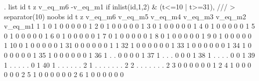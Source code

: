 . list id t z v_eq_m6 -v_eq_m1 if inlist(id,1,2) \& (t<=10 | t>=31), ///
> separator(10) noobs
{\smallskip}
  {\TLC}
  {\VBAR} id    t   z   v_eq_m6   v_eq_m5   v_eq_m4   v_eq_m3   v_eq_m2   v_eq_m1 {\VBAR}
  {\LFTT}
  {\VBAR}  1    1   0         1         0         0         0         0         0 {\VBAR}
  {\VBAR}  1    2   0         1         0         0         0         0         0 {\VBAR}
  {\VBAR}  1    3   0         1         0         0         0         0         0 {\VBAR}
  {\VBAR}  1    4   0         1         0         0         0         0         0 {\VBAR}
  {\VBAR}  1    5   0         1         0         0         0         0         0 {\VBAR}
  {\VBAR}  1    6   0         1         0         0         0         0         0 {\VBAR}
  {\VBAR}  1    7   0         1         0         0         0         0         0 {\VBAR}
  {\VBAR}  1    8   0         1         0         0         0         0         0 {\VBAR}
  {\VBAR}  1    9   0         1         0         0         0         0         0 {\VBAR}
  {\VBAR}  1   10   0         1         0         0         0         0         0 {\VBAR}
  {\LFTT}
  {\VBAR}  1   31   0         0         0         0         0         0         1 {\VBAR}
  {\VBAR}  1   32   1         0         0         0         0         0         0 {\VBAR}
  {\VBAR}  1   33   1         0         0         0         0         0         0 {\VBAR}
  {\VBAR}  1   34   1         0         0         0         0         0         0 {\VBAR}
  {\VBAR}  1   35   1         0         0         0         0         0         0 {\VBAR}
  {\VBAR}  1   36   1         .         .         0         0         0         0 {\VBAR}
  {\VBAR}  1   37   1         .         .         .         0         0         0 {\VBAR}
  {\VBAR}  1   38   1         .         .         .         .         0         0 {\VBAR}
  {\VBAR}  1   39   1         .         .         .         .         .         0 {\VBAR}
  {\VBAR}  1   40   1         .         .         .         .         .         . {\VBAR}
  {\LFTT}
  {\VBAR}  2    1   .         .         .         .         .         .         . {\VBAR}
  {\VBAR}  2    2   .         .         .         .         .         .         . {\VBAR}
  {\VBAR}  2    3   0         0         0         0         0         0         1 {\VBAR}
  {\VBAR}  2    4   1         0         0         0         0         0         0 {\VBAR}
  {\VBAR}  2    5   1         0         0         0         0         0         0 {\VBAR}
  {\VBAR}  2    6   1         0         0         0         0         0         0 {\VBAR}
